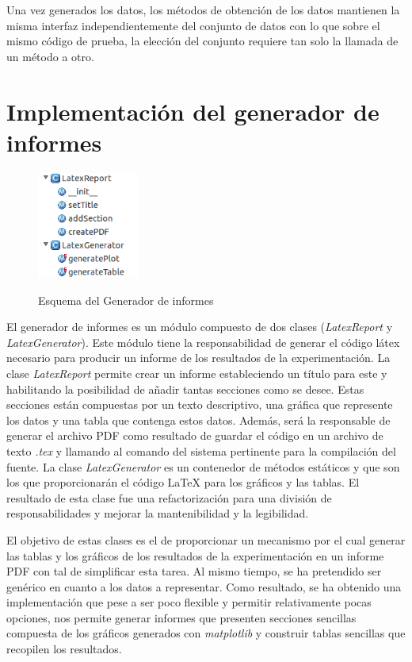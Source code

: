 \documentclass[10pt,a4paper]{report}
\begin{document}
Una vez generados los datos, los métodos de obtención de los datos mantienen la misma interfaz independientemente del conjunto de datos con lo que sobre el mismo código de prueba, la elección del conjunto requiere tan solo la llamada de un método a otro.

\section{Implementación del generador de informes}
\begin{figure}[h!]{}
    \centering
    \includegraphics[width=0.3\textwidth]{img/reporGeneratorScheme.png}
    \label{fig:EsquemaGeneradorInformes}
    \caption{Esquema del Generador de informes}
\end{figure}
El generador de informes es un módulo compuesto de dos clases (\textit{LatexReport} y \textit{LatexGenerator}). Este módulo tiene la responsabilidad de generar el código látex necesario para producir un informe de los resultados de la experimentación. 
La clase \textit{LatexReport} permite crear un informe estableciendo un título para este y habilitando la posibilidad de añadir tantas secciones como se desee. Estas secciones están compuestas por un texto descriptivo, una gráfica que represente los datos y una tabla que contenga estos datos. Además, será la responsable de generar el archivo PDF como resultado de guardar el código en un archivo de texto \textit{.tex} y llamando al comando del sistema pertinente para la compilación del fuente.
La clase \textit{LatexGenerator} es un contenedor de métodos estáticos y que son los que proporcionarán el código LaTeX para los gráficos y las tablas. El resultado de esta clase fue una refactorización para una división de responsabilidades y mejorar la mantenibilidad y la legibilidad.

El objetivo de estas clases es el de proporcionar un mecanismo por el cual generar las tablas y los gráficos de los resultados de la experimentación en un informe PDF con tal de simplificar esta tarea. Al mismo tiempo, se ha pretendido ser genérico en cuanto a los datos a representar. Como resultado, se ha obtenido una implementación que pese a ser poco flexible y permitir relativamente pocas opciones, nos permite generar informes que presenten secciones sencillas compuesta de los gráficos generados con \textit{matplotlib} y construir tablas sencillas que recopilen los resultados.
\end{document}
